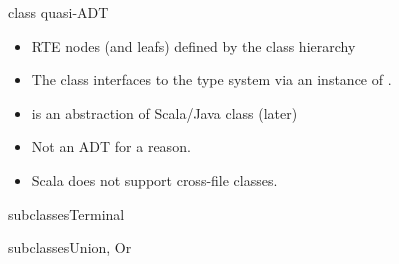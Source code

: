 \begin{frame}{ class quasi-ADT}
  \scalebox{0.6}{}

  \medskip

  \begin{itemize}
  \item RTE nodes (and leafs) defined by the class hierarchy 
  \item The  class interfaces to the type system via an instance of .
  \item {} is an abstraction of Scala/Java class (later)
  \item Not an ADT for a  reason.
  \item Scala does not support cross-file  classes.
  \end{itemize}
\end{frame}

\newsavebox\leafbox
\begin{lrbox}{\leafbox}
  \begin{minipage}{12cm}
    
  \end{minipage}
\end{lrbox}

\begin{frame}{ subclasses}{Terminal}
  \usebox\leafbox
\end{frame}

\newsavebox\orbox
\begin{lrbox}{\orbox}
  \begin{minipage}{12cm}
    
  \end{minipage}
\end{lrbox}

\newsavebox\andbox
\begin{lrbox}{\andbox}
  \begin{minipage}{12cm}
    
  \end{minipage}
\end{lrbox}


\begin{frame}{ subclasses}{Union, Or}
  \usebox\orbox
 \end{frame}




\newsavebox\catbox
\begin{lrbox}{\catbox}
  \begin{minipage}{12cm}
    
  \end{minipage}
\end{lrbox}


